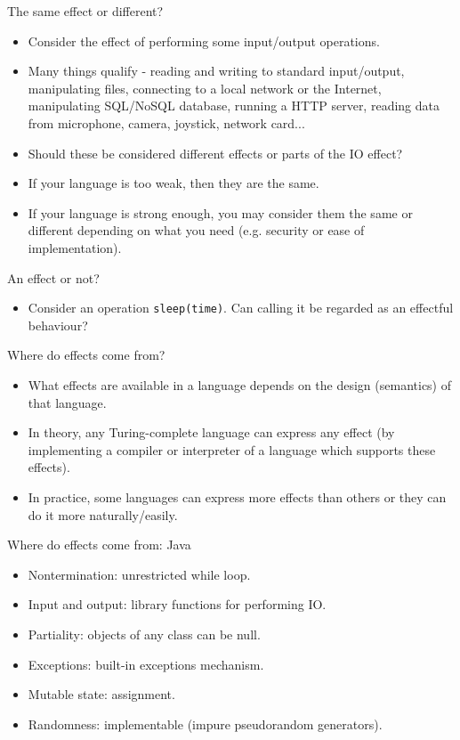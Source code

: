 \documentclass{beamer}
\begin{document}
\begin{frame}{The same effect or different?}
\begin{itemize}
	\item Consider the effect of performing some input/output operations.
	\item Many things qualify - reading and writing to standard input/output, manipulating files, connecting to a local network or the Internet, manipulating SQL/NoSQL database, running a HTTP server, reading data from microphone, camera, joystick, network card...
	\item Should these be considered different effects or parts of the IO effect?
	\item If your language is too weak, then they are the same.
	\item If your language is strong enough, you may consider them the same or different depending on what you need (e.g. security or ease of implementation).
\end{itemize}
\end{frame}

\begin{frame}{An effect or not?}
\begin{itemize}
	\item Consider an operation \texttt{sleep(time)}. Can calling it be regarded as an effectful behaviour?
\end{itemize}
\end{frame}


\begin{frame}{Where do effects come from?}
\begin{itemize}
	\item What effects are available in a language depends on the design (semantics) of that language.
	\item In theory, any Turing-complete language can express any effect (by implementing a compiler or interpreter of a language which supports these effects).
	\item In practice, some languages can express more effects than others or they can do it more naturally/easily.
\end{itemize}
\end{frame}

\begin{frame}{Where do effects come from: Java}
\begin{itemize}
	\item Nontermination: unrestricted while loop.
	\item Input and output: library functions for performing IO.
	\item Partiality: objects of any class can be null.
	\item Exceptions: built-in exceptions mechanism.
	\item Mutable state: assignment.
	\item Randomness: implementable (impure pseudorandom generators).
\end{itemize}
\end{frame}
\end{document}
